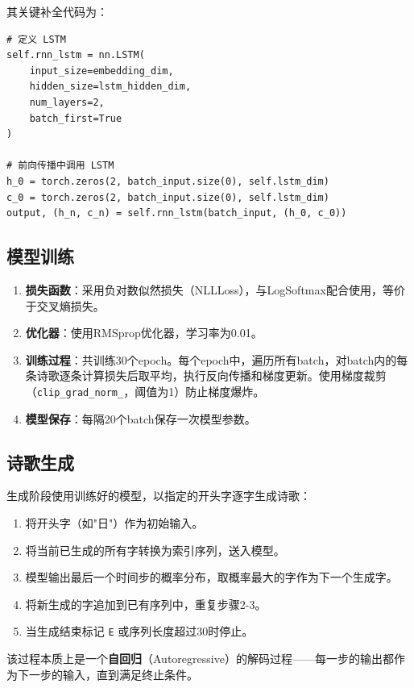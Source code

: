 \documentclass[12pt, a4paper]{ctexart}
\begin{document}
其关键补全代码为：
\begin{lstlisting}[caption={LSTM模型定义}]
# 定义 LSTM
self.rnn_lstm = nn.LSTM(
    input_size=embedding_dim,
    hidden_size=lstm_hidden_dim,
    num_layers=2,
    batch_first=True
)

# 前向传播中调用 LSTM
h_0 = torch.zeros(2, batch_input.size(0), self.lstm_dim)
c_0 = torch.zeros(2, batch_input.size(0), self.lstm_dim)
output, (h_n, c_n) = self.rnn_lstm(batch_input, (h_0, c_0))
\end{lstlisting}

\subsection{模型训练}

\begin{enumerate}
    \item \textbf{损失函数}：采用负对数似然损失（NLLLoss），与LogSoftmax配合使用，等价于交叉熵损失。
    \item \textbf{优化器}：使用RMSprop优化器，学习率为0.01。
    \item \textbf{训练过程}：共训练30个epoch。每个epoch中，遍历所有batch，对batch内的每条诗歌逐条计算损失后取平均，执行反向传播和梯度更新。使用梯度裁剪（\texttt{clip\_grad\_norm\_}，阈值为1）防止梯度爆炸。
    \item \textbf{模型保存}：每隔20个batch保存一次模型参数。
\end{enumerate}

\subsection{诗歌生成}

生成阶段使用训练好的模型，以指定的开头字逐字生成诗歌：

\begin{enumerate}
    \item 将开头字（如"日"）作为初始输入。
    \item 将当前已生成的所有字转换为索引序列，送入模型。
    \item 模型输出最后一个时间步的概率分布，取概率最大的字作为下一个生成字。
    \item 将新生成的字追加到已有序列中，重复步骤2-3。
    \item 当生成结束标记 \texttt{E} 或序列长度超过30时停止。
\end{enumerate}

该过程本质上是一个\textbf{自回归}（Autoregressive）的解码过程——每一步的输出都作为下一步的输入，直到满足终止条件。
\end{document}
